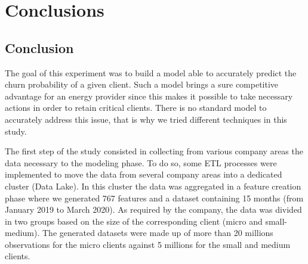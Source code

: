 \documentclass[LaM,binding=0.6cm, english]{sapthesis}
\begin{document}
\begin{table}[!htb]
\centering
{}
\vspace{2mm}
\caption{Final model results for different thresholds}
\label{final_results_summary}
\end{table}


\chapter{Conclusions}

\section{Conclusion}

The goal of this experiment was to build a model able to accurately predict the churn probability of a given client. Such a model brings a sure competitive advantage for an energy provider since this makes it possible to take necessary actions in order to retain critical clients. There is no standard model to accurately address this issue, that is why we tried different techniques in this study.

The first step of the study consisted in collecting from various company areas the data necessary to the modeling phase. To do so, some ETL processes were implemented to move the data from several company areas into a dedicated cluster (Data Lake). In this cluster the data was aggregated in a feature creation phase where we generated 767 features and a dataset containing 15 months (from January 2019 to March 2020). As required by the company, the data was divided in two groups based on the size of the corresponding client (micro and small-medium). The generated datasets were made up of more than 20 millions observations for the micro clients against 5 millions for the small and medium clients.
\end{document}

